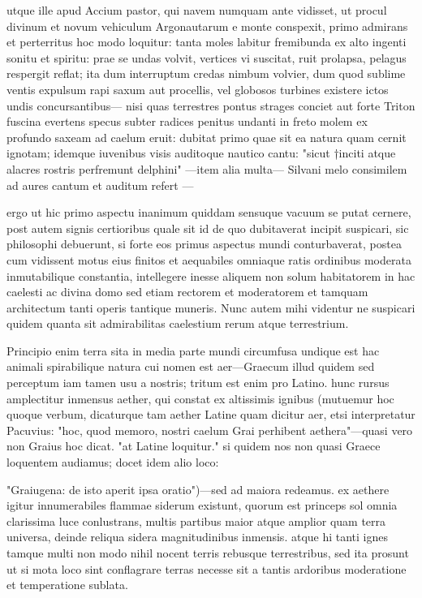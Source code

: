  utque ille apud Accium pastor, qui navem numquam ante vidisset, ut procul divinum et novum vehiculum Argonautarum e monte conspexit, primo admirans et perterritus hoc modo loquitur: tanta moles labitur fremibunda ex alto ingenti sonitu et spiritu: prae se undas volvit, vertices vi suscitat, ruit prolapsa, pelagus respergit reflat; ita dum interruptum credas nimbum volvier, dum quod sublime ventis expulsum rapi saxum aut procellis, vel globosos turbines existere ictos undis concursantibus— nisi quas terrestres pontus strages conciet aut forte Triton fuscina evertens specus subter radices penitus undanti in freto molem ex profundo saxeam ad caelum eruit: dubitat primo quae sit ea natura quam cernit ignotam; idemque iuvenibus visis auditoque nautico cantu: "sicut †inciti atque alacres rostris perfremunt delphini" —item alia multa— Silvani melo consimilem ad aures cantum et auditum refert —

 ergo ut hic primo aspectu inanimum quiddam sensuque vacuum se putat cernere, post autem signis certioribus quale sit id de quo dubitaverat incipit suspicari, sic philosophi debuerunt, si forte eos primus aspectus mundi conturbaverat, postea cum vidissent motus eius finitos et aequabiles omniaque ratis ordinibus moderata inmutabilique constantia, intellegere inesse aliquem non solum habitatorem in hac caelesti ac divina domo sed etiam rectorem et moderatorem et tamquam architectum tanti operis tantique muneris. Nunc autem mihi videntur ne suspicari quidem quanta sit admirabilitas caelestium rerum atque terrestrium.

 Principio enim terra sita in media parte mundi circumfusa undique est hac animali spirabilique natura cui nomen est aer—Graecum illud quidem sed perceptum iam tamen usu a nostris; tritum est enim pro Latino. hunc rursus amplectitur inmensus aether, qui constat ex altissimis ignibus (mutuemur hoc quoque verbum, dicaturque tam aether Latine quam dicitur aer, etsi interpretatur Pacuvius: "hoc, quod memoro, nostri caelum Grai perhibent aethera"—quasi vero non Graius hoc dicat. "at Latine loquitur." si quidem nos non quasi Graece loquentem audiamus; docet idem alio loco:

 "Graiugena: de isto aperit ipsa oratio")—sed ad maiora redeamus. ex aethere igitur innumerabiles flammae siderum existunt, quorum est princeps sol omnia clarissima luce conlustrans, multis partibus maior atque amplior quam terra universa, deinde reliqua sidera magnitudinibus inmensis. atque hi tanti ignes tamque multi non modo nihil nocent terris rebusque terrestribus, sed ita prosunt ut si mota loco sint conflagrare terras necesse sit a tantis ardoribus moderatione et temperatione sublata.

